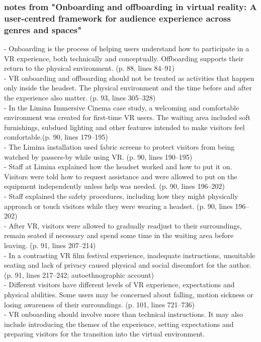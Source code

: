 \subsubsection{notes from "Onboarding and offboarding in virtual reality: A user-centred framework for audience experience across genres and spaces"}
- Onboarding is the process of helping users understand how to participate in a VR experience, both technically and conceptually. Offboarding supports their return to the physical environment.
(p. 88, lines 84–91)
\\
- VR onboarding and offboarding should not be treated as activities that happen only inside the headset. The physical environment and the time before and after the experience also matter.
(p. 93, lines 305–328)
\\
- In the Limina Immersive Cinema case study, a welcoming and comfortable environment was created for first-time VR users. The waiting area included soft furnishings, subdued lighting and other features intended to make visitors feel comfortable.(p. 90, lines 179–195)
\\
- The Limina installation used fabric screens to protect visitors from being watched by passers-by while using VR.
(p. 90, lines 190–195)
\\
- Staff at Limina explained how the headset worked and how to put it on. Visitors were told how to request assistance and were allowed to put on the equipment independently unless help was needed.
(p. 90, lines 196–202)
\\
- Staff explained the safety procedures, including how they might physically approach or touch visitors while they were wearing a headset.
(p. 90, lines 196–202)
\\
- After VR, visitors were allowed to gradually readjust to their surroundings, remain seated if necessary and spend some time in the waiting area before leaving.
(p. 91, lines 207–214)
\\
- In a contrasting VR film festival experience, inadequate instructions, unsuitable seating and lack of privacy caused physical and social discomfort for the author.
(p. 91, lines 217–242; autoethnographic account)
\\
- Different visitors have different levels of VR experience, expectations and physical abilities. Some users may be concerned about falling, motion sickness or losing awareness of their surroundings.
(p. 101, lines 721–736)
\\
- VR onboarding should involve more than technical instructions. It may also include introducing the themes of the experience, setting expectations and preparing visitors for the transition into the virtual environment.
